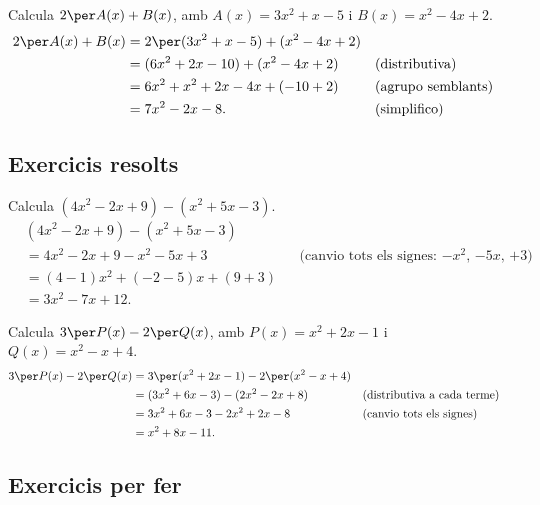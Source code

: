 \begin{exemple}
Calcula $2\per A(x) + B(x)$, amb $A(x) = 3x^2 + x - 5$ i
$B(x) = x^2 - 4x + 2$.
\begin{align*}
2\per A(x) + B(x)
  &= 2\per(3x^2+x-5) + (x^2-4x+2) \\
  &= (6x^2+2x-10) + (x^2-4x+2)      &&\text{(distributiva)} \\
  &= 6x^2+x^2 + 2x-4x + (-10+2)     &&\text{(agrupo semblants)} \\
  &= 7x^2 - 2x - 8.                  &&\text{(simplifico)}
\end{align*}
\end{exemple}

\subsection{Exercicis resolts}

\begin{exresolt}
Calcula $(4x^2 - 2x + 9) - (x^2 + 5x - 3)$.
\solucio
\begin{align*}
&(4x^2-2x+9)-(x^2+5x-3) \\
&= 4x^2-2x+9 - x^2-5x+3   &&\text{(canvio tots els signes: $-x^2$, $-5x$, $+3$)} \\
&= (4-1)x^2 + (-2-5)x + (9+3) \\
&= 3x^2 - 7x + 12.
\end{align*}
\end{exresolt}

\begin{exresolt}
Calcula $3\per P(x) - 2\per Q(x)$, amb $P(x) = x^2 + 2x - 1$ i
$Q(x) = x^2 - x + 4$.
\solucio
\begin{align*}
3\per P(x) - 2\per Q(x)
  &= 3\per(x^2+2x-1) - 2\per(x^2-x+4) \\
  &= (3x^2+6x-3) - (2x^2-2x+8)       &&\text{(distributiva a cada terme)} \\
  &= 3x^2+6x-3 - 2x^2+2x-8           &&\text{(canvio tots els signes)} \\
  &= x^2 + 8x - 11.
\end{align*}
\end{exresolt}

\subsection{Exercicis per fer}

